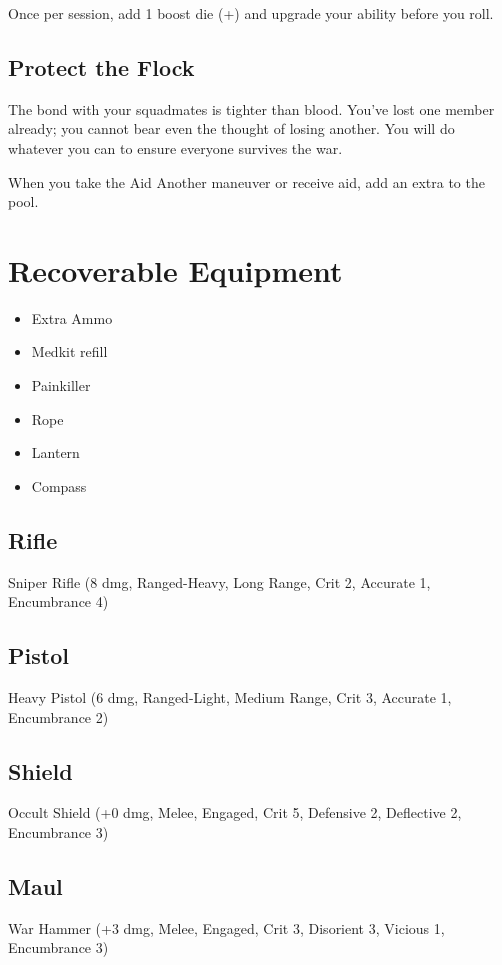 \documentclass{book}
\newcommand{\bbb}{\BoostDie }
\begin{document}
\begin{multicols}{2}
Once per session, add 1 boost die (+\bbb) and upgrade your ability before you roll.

\subsection{Protect the Flock}

The bond with your squadmates is tighter than blood.  You've lost one member already; you cannot bear even the thought of losing another.  You will do whatever you can to ensure everyone survives the war.

When you take the Aid Another maneuver or receive aid, add an extra \Advantage\Advantage to the pool.

\section{Recoverable Equipment}

\begin{itemize}
    \item Extra Ammo
    \item Medkit refill
    \item Painkiller
    \item Rope
    \item Lantern
    \item Compass
\end{itemize}

\subsection{Rifle}

Sniper Rifle (8 dmg, Ranged-Heavy, Long Range, Crit 2, Accurate 1, Encumbrance 4)

\subsection{Pistol}

Heavy Pistol (6 dmg, Ranged-Light, Medium Range, Crit 3, Accurate 1, Encumbrance 2)

\subsection{Shield}

Occult Shield (+0 dmg, Melee, Engaged, Crit 5, Defensive 2, Deflective 2, Encumbrance 3)

\subsection{Maul}

War Hammer (+3 dmg, Melee, Engaged, Crit 3, Disorient 3, Vicious 1, Encumbrance 3)

\end{multicols}
\end{document}

